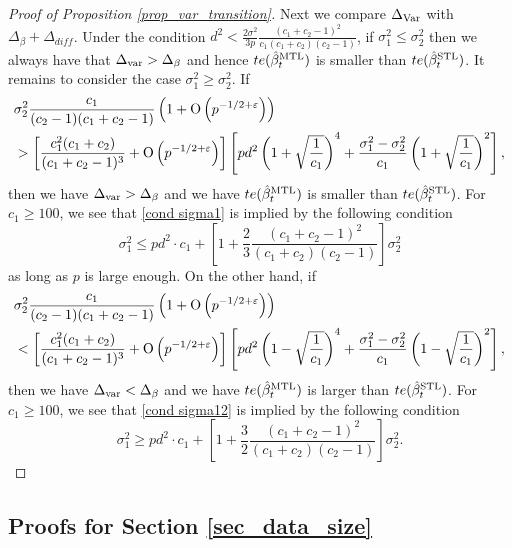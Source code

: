 \begin{proof}[Proof of Proposition \ref{prop_var_transition}]
Next we compare $\Delta_{\operatorname{Var}}$ with $\Delta_\beta + \Delta_{diff}$. Under the condition $d^2 < \frac {2\sigma^2} {3p} \frac{(c_1 + c_2 -1)^2}{c_1 (c_1 + c_2)(c_2 - 1)}$, if $\sigma_1^2\le \sigma_2^2$ then we always have that $\Delta_{\text{var}} > \Delta_{\beta}$ and hence $te(\hat{\beta}_t^{\text{MTL}})$ is smaller than $te(\hat{\beta}_t^{\text{STL}})$. It remains to consider the case $\sigma_1^2 \ge \sigma_2^2$. If 
\begin{align} 
&\sigma_2^2  \frac{c_1}{(c_2-1)(c_1 + c_2 -1)}\left(1 + \operatorname{O}\left(p^{-1/2 + \varepsilon}\right)\right) \label{cond sigma1}\\
&> \left[\frac{c_1^2 (c_1+c_2)}{(c_1+c_2-1)^3} + \operatorname{O}\left(p^{-1/2 + \varepsilon}\right)\right]\left[pd^2 \left({1 + \sqrt{\frac{1}{c_1}}}\right)^4 + \frac{\sigma_1^2-\sigma_2^2}{c_1} \left({1 + \sqrt{\frac{1}{c_1}}}\right)^2\right] ,\nonumber
\end{align}
then we have $\Delta_{\text{var}} > \Delta_{\beta}$ and we have $te(\hat{\beta}_t^{\text{MTL}})$ is smaller than $te(\hat{\beta}_t^{\text{STL}})$. For $c_1\ge 100$, we see that \eqref{cond sigma1} is implied by the following condition
$$\sigma_1^2 \le pd^2 \cdot c_1 + \left[ 1+ \frac23\frac{(c_1 + c_2 - 1)^2}{(c_1 + c_2) (c_2 - 1)} \right]\sigma_2^2$$
as long as $p$ is large enough. On the other hand, if 
\begin{align} 
&\sigma_2^2  \frac{c_1}{(c_2-1)(c_1 + c_2 -1)}\left(1 + \operatorname{O}\left(p^{-1/2 + \varepsilon}\right)\right) \label{cond sigma12}\\
&< \left[\frac{c_1^2 (c_1+c_2)}{(c_1+c_2-1)^3} + \operatorname{O}\left(p^{-1/2 + \varepsilon}\right)\right]\left[pd^2 \left({1 - \sqrt{\frac{1}{c_1}}}\right)^4 + \frac{\sigma_1^2-\sigma_2^2}{c_1} \left({1 - \sqrt{\frac{1}{c_1}}}\right)^2\right] ,\nonumber
\end{align}
then we have $\Delta_{\text{var}} < \Delta_{\beta}$ and we have $te(\hat{\beta}_t^{\text{MTL}})$ is larger than $te(\hat{\beta}_t^{\text{STL}})$. For $c_1\ge 100$, we see that \eqref{cond sigma12} is implied by the following condition
$$\sigma_1^2 \ge  pd^2 \cdot c_1 + \left[ 1+ \frac32\frac{(c_1 + c_2 - 1)^2}{(c_1 + c_2) (c_2 - 1)} \right]\sigma_2^2.$$
\end{proof}





\subsection{Proofs for Section \ref{sec_data_size}}\label{app_proof_data}


